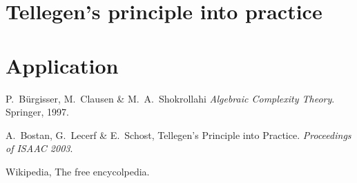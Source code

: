 \documentclass{article}
\begin{document}
  
  \section{Tellegen's principle into practice}
  \label{sec:practice}
  
  \section{Application}


  
  \begin{thebibliography}{1}
    
  P.~Bürgisser, M.~Clausen \& M.~A.~Shokrollahi
    \emph{Algebraic Complexity Theory}.
    Springer, 1997.
    
  A.~Bostan, G.~Lecerf \& E.~Schost,
    Tellegen's Principle into Practice.
    \emph{Proceedings of ISAAC 2003}.

  Wikipedia, The free encycolpedia.
  
  \end{thebibliography}
\end{document}
